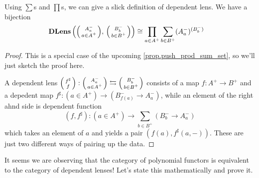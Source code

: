 \documentclass[DynamicalBook]{subfiles}
\begin{document}
\begin{lemma}\label{lem.dependent_lens_calculation}
  Using $\sum$s and $\prod$s, we can give a slick definition of dependent lens.
  We have a bijection 
\[\Cat{DLens}\left( \lens{A^-_{a}}{a \in A^+},\, \lens{B^-_{b}}{b \in B^+}
  \right) \cong \prod_{a \in A^+} \sum_{b \in B^+} (A^-_{a})^{(B^-_{b})}\quad\]
\end{lemma}
\begin{proof}
  This is a special case of the upcoming \cref{prop.push_prod_sum_set}, so we'll
  just sketch the proof here. 

  A dependent lens $\lens{f^{\sharp}}{f} : \lens{A^-_{a}}{a \in A^+} \fromto
  \lens{B^-_{b}}{b \in B^+}$ consists of a map $f : A^+ \to B^+$ and a depedent
  map $f^{\sharp} : (a \in A^+) \to (B^-_{f(a)} \to A^-_a)$, while an element of
  the right ahnd side is dependent function
  $$(f, f^{\sharp}) : (a \in A^+) \to \sum_{b \in B^+} (B^-_b \to A^-_a)$$
  which takes an element of $a$ and yields a pair $(f(a), f^{\sharp}(a,-))$.
  These are just two different ways of pairing up the data.
\end{proof}

It seems we are observing that the category of polynomial functors is
equivalent to the category of dependent lenses! Let's state this mathematically and prove it.
\end{document}
